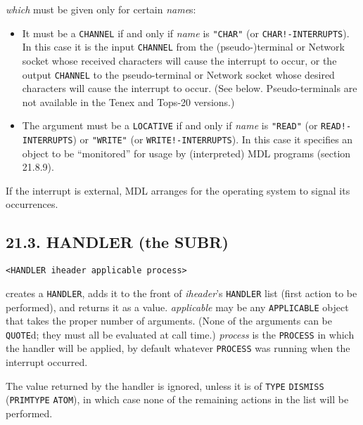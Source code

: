 \documentclass[a4paper,]{article}
\providecommand{\tightlist}{%
  \setlength{\itemsep}{0pt}\setlength{\parskip}{0pt}}
\begin{document}
\emph{which} must be given only for certain \emph{name}s:

\begin{itemize}
\tightlist
\item
  It must be a \texttt{CHANNEL} if and only if \emph{name} is \texttt{"CHAR"} (or \texttt{CHAR!-INTERRUPTS}). In this case
  it is the input \texttt{CHANNEL} from the (pseudo-)terminal or Network socket whose received characters will cause the
  interrupt to occur, or the output \texttt{CHANNEL} to the pseudo-terminal or Network socket whose desired characters will
  cause the interrupt to occur. (See below. Pseudo-terminals are not available in the Tenex and
  Tops-20 versions.)
\item
  The argument must be a \texttt{LOCATIVE} if and only if \emph{name} is \texttt{"READ"} (or \texttt{READ!-INTERRUPTS}) or
  \texttt{"WRITE"} (or \texttt{WRITE!-INTERRUPTS}). In this case it specifies an object to be ``monitored'' for usage by
  (interpreted) MDL programs (section 21.8.9).
\end{itemize}

If the interrupt is external, MDL arranges for the operating system to signal its occurrences.

\subsection{21.3. HANDLER (the SUBR)}\label{handler-the-subr}

\begin{verbatim}
<HANDLER iheader applicable process>
\end{verbatim}

 creates a \texttt{HANDLER}, adds it to the front of \emph{iheader}'s \texttt{HANDLER} list
(first action to be performed), and returns it as a value. \emph{applicable} may be any \texttt{APPLICABLE} object that
takes the proper number of arguments. (None of the arguments can be \texttt{QUOTE}d; they must all be evaluated at call
time.) \emph{process} is the \texttt{PROCESS} in which the handler will be applied, by default whatever \texttt{PROCESS}
was running when the interrupt occurred.

The value returned by the handler is ignored, unless it is of \texttt{TYPE} \texttt{DISMISS}
(\texttt{PRIMTYPE} \texttt{ATOM}), in which case none of the remaining actions in the list will be performed.
\end{document}
